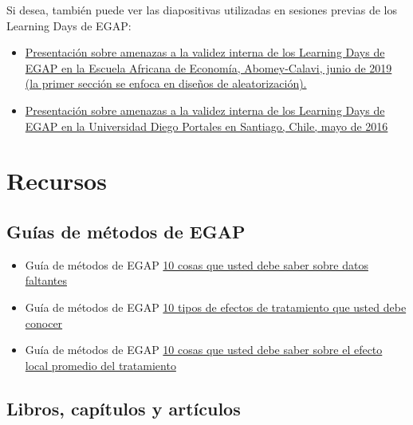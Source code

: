 \documentclass[12pt,spanish,]{book}
\begin{document}
Si desea, también puede ver las diapositivas utilizadas en sesiones previas de los Learning Days de EGAP:

\begin{itemize}
\item
  \href{https://egap.github.io/learningdays-resources/Slides/Examples/threats-benin.pdf}{Presentación sobre amenazas a la validez interna de los Learning Days de EGAP en la Escuela Africana de Economía, Abomey-Calavi, junio de 2019 (la primer sección se enfoca en diseños de aleatorización).}
\item
  \href{https://egap.github.io/learningdays-resources/Slides/Examples/threats-santiago.pdf}{Presentación sobre amenazas a la validez interna de los Learning Days de EGAP en la Universidad Diego Portales en Santiago, Chile, mayo de 2016}
\end{itemize}

\hypertarget{recursos-7}{%
\section{Recursos}\label{recursos-7}}

\hypertarget{guuxedas-de-muxe9todos-de-egap-6}{%
\subsection{Guías de métodos de EGAP}\label{guuxedas-de-muxe9todos-de-egap-6}}

\begin{itemize}
\item
  Guía de métodos de EGAP \href{https://egap.org/resource/10-things-to-know-about-missing-data/}{10 cosas que usted debe saber sobre datos faltantes}
\item
  Guía de métodos de EGAP \href{https://egap.org/resource/10-types-of-treatment-effect-you-should-know-about/}{10 tipos de efectos de tratamiento que usted debe conocer}
\item
  Guía de métodos de EGAP \href{https://egap.org/resource/10-things-to-know-about-the-local-average-treatment-effect/}{10 cosas que usted debe saber sobre el efecto local promedio del tratamiento}
\end{itemize}

\hypertarget{libros-capuxedtulos-y-artuxedculos-5}{%
\subsection{Libros, capítulos y artículos}\label{libros-capuxedtulos-y-artuxedculos-5}}
\end{document}
